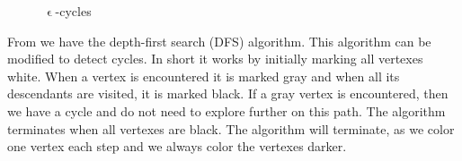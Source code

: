 \begin{figure}
  \centering {}
\caption{$\upvarepsilon$-cycles}
\label{fig:inf_loop}
\end{figure}


From \cite{Cormen} we have the depth-first search (DFS)
algorithm. This algorithm can be modified to detect cycles. In short
it works by initially marking all vertexes white. When a vertex is
encountered it is marked gray and when all its descendants are
visited, it is marked black. If a gray vertex is encountered, then we
have a cycle and do not need to explore further on this path. The
algorithm terminates when all vertexes are black. The algorithm will
terminate, as we color one vertex each step and we always color the
vertexes darker.

